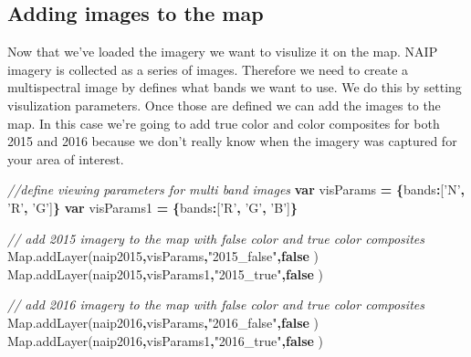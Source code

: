 \documentclass[]{article}
\newenvironment{Shaded}{\begin{snugshade}}{\end{snugshade}}
\newcommand{\KeywordTok}[1]{\textcolor[rgb]{0.13,0.29,0.53}{\textbf{#1}}}
\newcommand{\DataTypeTok}[1]{\textcolor[rgb]{0.13,0.29,0.53}{#1}}
\newcommand{\StringTok}[1]{\textcolor[rgb]{0.31,0.60,0.02}{#1}}
\newcommand{\CommentTok}[1]{\textcolor[rgb]{0.56,0.35,0.01}{\textit{#1}}}
\newcommand{\VariableTok}[1]{\textcolor[rgb]{0.00,0.00,0.00}{#1}}
\newcommand{\OperatorTok}[1]{\textcolor[rgb]{0.81,0.36,0.00}{\textbf{#1}}}
\newcommand{\AttributeTok}[1]{\textcolor[rgb]{0.77,0.63,0.00}{#1}}
\newcommand{\NormalTok}[1]{#1}
\begin{document}
\subsection{Adding images to the map}\label{adding-images-to-the-map}

Now that we've loaded the imagery we want to visulize it on the map.
NAIP imagery is collected as a series of images. Therefore we need to
create a multispectral image by defines what bands we want to use. We do
this by setting visulization parameters. Once those are defined we can
add the images to the map. In this case we're going to add true color
and color composites for both 2015 and 2016 because we don't really know
when the imagery was captured for your area of interest.

\begin{Shaded}
\begin{Highlighting}[]

\CommentTok{//define viewing parameters for multi band images}
\KeywordTok{var}\NormalTok{ visParams }\OperatorTok{=} \OperatorTok{\{}\DataTypeTok{bands}\OperatorTok{:}\NormalTok{[}\StringTok{'N'}\OperatorTok{,} \StringTok{'R'}\OperatorTok{,} \StringTok{'G'}\NormalTok{]}\OperatorTok{\}}
\KeywordTok{var}\NormalTok{ visParams1 }\OperatorTok{=} \OperatorTok{\{}\DataTypeTok{bands}\OperatorTok{:}\NormalTok{[}\StringTok{'R'}\OperatorTok{,} \StringTok{'G'}\OperatorTok{,} \StringTok{'B'}\NormalTok{]}\OperatorTok{\}}

\CommentTok{// add 2015 imagery to the map with false color and true color composites}
\VariableTok{Map}\NormalTok{.}\AttributeTok{addLayer}\NormalTok{(naip2015}\OperatorTok{,}\NormalTok{visParams}\OperatorTok{,}\StringTok{"2015_false"}\OperatorTok{,}\KeywordTok{false}\NormalTok{ )}
\VariableTok{Map}\NormalTok{.}\AttributeTok{addLayer}\NormalTok{(naip2015}\OperatorTok{,}\NormalTok{visParams1}\OperatorTok{,}\StringTok{"2015_true"}\OperatorTok{,}\KeywordTok{false}\NormalTok{ )}

\CommentTok{// add 2016 imagery to the map with false color and true color composites}
\VariableTok{Map}\NormalTok{.}\AttributeTok{addLayer}\NormalTok{(naip2016}\OperatorTok{,}\NormalTok{visParams}\OperatorTok{,}\StringTok{"2016_false"}\OperatorTok{,}\KeywordTok{false}\NormalTok{ )}
\VariableTok{Map}\NormalTok{.}\AttributeTok{addLayer}\NormalTok{(naip2016}\OperatorTok{,}\NormalTok{visParams1}\OperatorTok{,}\StringTok{"2016_true"}\OperatorTok{,}\KeywordTok{false}\NormalTok{ )}
\end{Highlighting}
\end{Shaded}
\end{document}
